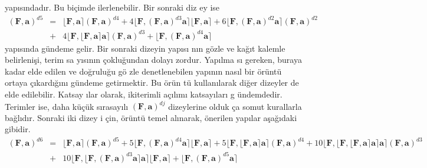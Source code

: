 \documentclass[a4paper,10pt]{article}
\begin{document}
yap\i s\i ndad\i r. Bu bi\c{c}imde ilerlenebilir. Bir sonraki diz%
ey ise %
\begin{eqnarray}
 \left(\mathbf{F},\mathbf{a}\right)^{d5} &=&
 \lfloor \mathbf{F} , \mathbf{a} \rceil 
 \left(\mathbf{F},\mathbf{a}\right)^{d4}
 + 4 \lfloor \mathbf{F} , \left(\mathbf{F},%
 \mathbf{a}\right)^{d3}\mathbf{a} \rceil
 \lfloor \mathbf{F} , \mathbf{a} \rceil
 + 6 \lfloor \mathbf{F} , \left(\mathbf{F},%
 \mathbf{a}\right)^{d2}\mathbf{a} \rceil
 \left(\mathbf{F},\mathbf{a}\right)^{d2} \nonumber\\
 &+& 4  \lfloor \mathbf{F} ,  \lfloor \mathbf{F} , 
 \mathbf{a} \rceil  
 \mathbf{a} \rceil \left(\mathbf{F},\mathbf{a}\right)^{d3}
 +  \lfloor \mathbf{F} , %
 \left(\mathbf{F},\mathbf{a}\right)^{d4}\mathbf{a} \rceil
\end{eqnarray}
yap\i s\i nda g\"undeme gelir. Bir sonraki di\-zeyin yap{\i}s{\i}%
n{\i}n g\"ozle ve ka\u{g}\i t kalemle be\-lirleni\c{s}i, terim sa%
y\i s\i n\i n \c{c}oklu\u{g}undan dolay{\i} zor\-dur. Ya\-p\i lma%
s{\i} gereken, buraya kadar elde edilen ve do\u{g}rulu\u{g}u g\"o%
zle denetlenebilen yap\i n\i n nas\i l bir \"or\"unt\"u or\-taya %
\c{c}\i kard\i \u{g}\i n{\i} g\"undeme getirmektir. Bu \"o\-r\"un%
t\"u kullan\i larak di\u{g}er dizeyler de elde edilebilir. Katsay%
\i lar olarak, ikiterimli a\c{c}\i l\i m{\i} kat\-say\i lar{\i} g%
\"undemdedir. Terimler ise, daha k\"u\c{c}\"uk s\i rasay\i l{\i} %
$\left(\mathbf{F},\mathbf{a}\right)^{dj}$ dizey\-leri\-ne ol\-duk%
\c{c}a somut kurallarla ba\u{g}l\i d\i r. Son\-ra\-ki iki dizey i%
\c{c}in, \"or\"unt\"u temel al\i narak, \"o\-ne\-rilen yap\i lar %
a\c{s}a\u{g}\i daki gibidir. %
\begin{eqnarray}
 \left(\mathbf{F},\mathbf{a}\right)^{d6} &=&
 \lfloor \mathbf{F} , \mathbf{a} \rceil
 \left(\mathbf{F},\mathbf{a}\right)^{d5}
 + 5 \lfloor \mathbf{F} , \left(\mathbf{F},%
\mathbf{a}\right)^{d4}\mathbf{a} \rceil
 \lfloor \mathbf{F} , \mathbf{a} \rceil 
 + 5 \lfloor \mathbf{F} , \lfloor \mathbf{F} , 
 \mathbf{a} \rceil \mathbf{a} \rceil
 \left(\mathbf{F},\mathbf{a}\right)^{d4}
 + 10  \lfloor \mathbf{F} ,  \lfloor \mathbf{F} , 
 \lfloor \mathbf{F} 
 , \mathbf{a} \rceil \mathbf{a} \rceil \mathbf{a} \rceil 
 \left(\mathbf{F},\mathbf{a}\right)^{d3} \nonumber\\
 &+& 10  \lfloor \mathbf{F} ,  \lfloor \mathbf{F} , 
 \left(\mathbf{F},\mathbf{a}\right)^{d3}\mathbf{a} 
 \rceil\mathbf{a} \rceil 
 \lfloor \mathbf{F} , \mathbf{a} \rceil
 +  \lfloor \mathbf{F} ,  
 \left(\mathbf{F},\mathbf{a}\right)^{d5}\mathbf{a} \rceil
\label{eq:dd6}
\end{eqnarray}
\end{document}
